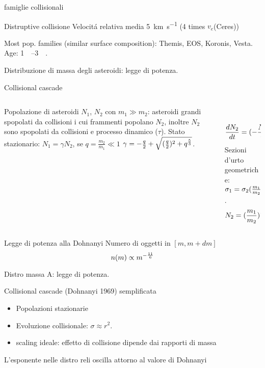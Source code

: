\begin{wordonframe}{famiglie collisionali}\tolbf
\begin{block}{Distruptive collisione}
Velocit\'a relativa media \SI{5}{\kilo\meter\per\second} (4 times $v_e$(Ceres))
\end{block}
Most pop. families (similar surface composition): Themis, EOS, Koronis, Vesta. Age: \SIrange{1}{3}{\giga\year}.
\end{wordonframe}

\begin{frame}{Distribuzione di massa degli asteroidi: legge di potenza.}
\begin{block}{Collisional cascade}
\begin{columns}[T]\begin{column}{0.5\textwidth}
Popolazione di asteroidi $N_1$, $N_2$ con $m_1\gg m_2$: asteroidi grandi spopolati da collisioni i cui frammenti popolano $N_2$, inoltre $N_2$ sono spopolati da collisioni e processo dinamico ($\tau$).
Stato stazionario: $N_1=\gamma N_2$, se $q=\frac{m_2}{m_1}\ll1$ $\gamma=-\frac{q}{2}+\sqrt{(\frac{q}{2})^2+q\expy{\frac{5}{3}}}$.
\end{column}\begin{column}{0.5\textwidth}
\begin{align*}
\TDy{t}{N_1}=-\alpha\sigma_1N_1^2\\
\TDy{t}{N_2}=(-\frac{N_2}{\tau})-\alpha\sigma_2N_1^2+(\frac{m_1}{m_2})\alpha\sigma_1N_1^2
\end{align*}
Sezioni d'urto geometriche: $\sigma_1=\sigma_2(\frac{m_1}{m_2})\expy{\frac{2}{3}}$.
\begin{equation*}
N_2=(\frac{m_1}{m_2})\expy{\frac{5}{6}}N_1
\end{equation*}
\end{column}  \end{columns}
\end{block}
\begin{block}{Legge di potenza alla Dohnanyi}
 Numero di oggetti in $[m,m+dm]$
\begin{equation*}
n(m)\propto m\expy{-\frac{11}{6}}
\end{equation*}
\end{block}
\end{frame}

\begin{wordonframe}{Distro massa A: legge di potenza.}
\begin{block}{Collisional cascade (Dohnanyi 1969) semplificata}
\begin{itemize}
\item Popolazioni stazionarie
\item Evoluzione collisionale: $\sigma\approx r^2$.
\item scaling ideale: effetto di collisione dipende dai rapporti di massa
\end{itemize}
L'esponente nelle distro reli oscilla attorno al valore di Dohnanyi
\end{block}

\end{wordonframe}

